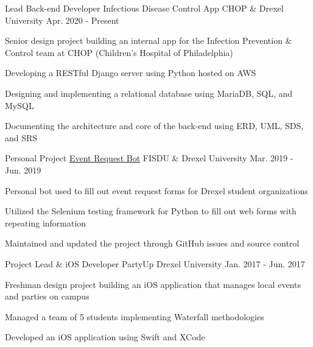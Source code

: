 

\begin{cventries}

  \cventry
    {Lead Back-end Developer} %
    {Infectious Disease Control App} %
    {CHOP \& Drexel University} %
    {Apr. 2020 - Present} %
    {
      \begin{cvitems} %
        \item Senior design project building an internal app for the Infection Prevention \& Control team at CHOP (Children's Hospital of Philadelphia)
        \item Developing a RESTful Django server using Python hosted on AWS
        \item Designing and implementing a relational database using MariaDB, SQL, and MySQL
        \item Documenting the architecture and core of the back-end using ERD, UML, SDS, and SRS
      \end{cvitems}
    }

  \cventry
    {Personal Project} %
    {\href{https://github.com/AbirRazzak/event-request-bot}{Event Request Bot}} %
    {FISDU \& Drexel University} %
    {Mar. 2019 - Jun. 2019} %
    {
      \begin{cvitems} %
        \item Personal bot used to fill out event request forms for Drexel student organizations
        \item Utilized the Selenium testing framework for Python to fill out web forms with repeating information
        \item Maintained and updated the project through GitHub issues and source control
      \end{cvitems}
    }

  \cventry
    {Project Lead \& iOS Developer} %
    {PartyUp} %
    {Drexel University} %
    {Jan. 2017 - Jun. 2017} %
    {
      \begin{cvitems} %
        \item Freshman design project building an iOS application that manages local events and parties on campus
        \item Managed a team of 5 students implementing Waterfall methodologies
        \item Developed an iOS application using Swift and XCode
      \end{cvitems}
    }

\end{cventries}